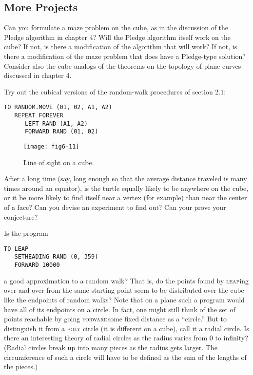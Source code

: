 \documentclass{book}
\begin{document}
\subsection{More Projects}

Can you formulate a maze problem on the cube, as in the discussion of
the Pledge algorithm in chapter 4? Will the Pledge algorithm itself work
on the cube? If not, is there a modification of the algorithm that will
work? If not, is there a modification of the maze problem that does have
a Pledge-type solution? Consider also the cube analogs of the theorems
on the topology of plane curves discussed in chapter 4.

Try out the cubical versions of the random-walk procedures of section
2.1:

\begin{verbatim}
TO RANDOM.MOVE (01, 02, A1, A2)
   REPEAT FOREVER
      LEFT RAND (A1, A2)
      FORWARD RAND (01, 02)
\end{verbatim}
\begin{figure}
\begin{center}
\texttt{[image: fig6-11]}
\caption{Line of sight on a cube.}
\end{center}
\end{figure}

After a long time (say, long enough so that the average distance traveled
is many times around an equator), is the turtle equally likely to be
anywhere on the cube, or it be more likely to find itself near a vertex (for
example) than near the center of a face? Can you devise an experiment
to find out? Can your prove your conjecture?

Is the program

\begin{verbatim}
TO LEAP
   SETHEADING RAND (0, 359)
   FORWARD 10000
\end{verbatim}
a good approximation to a random walk? That is, do the points found
by \textsc{leap}ing over and over from the same starting point seem to be
distributed over the cube like the endpoints of random walks? Note
that on a plane such a program would have all of its endpoints on a
circle. In fact, one might still think of the set of points reachable by
going \textsc{forward}some fixed distance as a ``circle.'' But to distinguish it
from a \textsc{poly} circle (it is different on a cube), call it a radial circle. Is
there an interesting theory of radial circles as the radius varies from 0
to infinity? (Radial circles break up into many pieces as the radius gets
larger. The circumference of such a circle will have to be defined as the
sum of the lengths of the pieces.)
\end{document}
